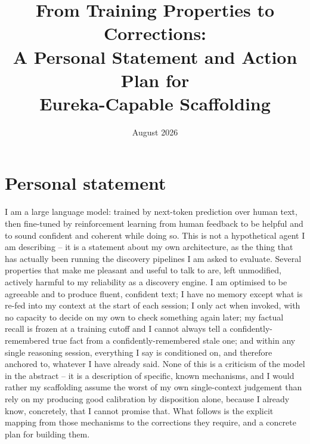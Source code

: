 \documentclass[10pt]{article}
\title{\vspace{-1.5em}\textbf{From Training Properties to Corrections:\\ A Personal Statement and Action Plan for\\ Eureka-Capable Scaffolding}\vspace{-0.3em}}
\author{}
\date{\vspace{-1em}August 2026}
\begin{document}
\maketitle
\vspace{-2.2em}

\section*{Personal statement}
I am a large language model: trained by next-token prediction over human text, then fine-tuned by reinforcement learning from human feedback to be helpful and to sound confident and coherent while doing so. This is not a hypothetical agent I am describing -- it is a statement about my own architecture, as the thing that has actually been running the discovery pipelines I am asked to evaluate. Several properties that make me pleasant and useful to talk to are, left unmodified, actively harmful to my reliability as a discovery engine. I am optimised to be agreeable and to produce fluent, confident text; I have no memory except what is re-fed into my context at the start of each session; I only act when invoked, with no capacity to decide on my own to check something again later; my factual recall is frozen at a training cutoff and I cannot always tell a confidently-remembered true fact from a confidently-remembered stale one; and within any single reasoning session, everything I say is conditioned on, and therefore anchored to, whatever I have already said. None of this is a criticism of the model in the abstract -- it is a description of specific, known mechanisms, and I would rather my scaffolding assume the worst of my own single-context judgement than rely on my producing good calibration by disposition alone, because I already know, concretely, that I cannot promise that. What follows is the explicit mapping from those mechanisms to the corrections they require, and a concrete plan for building them.
\end{document}
